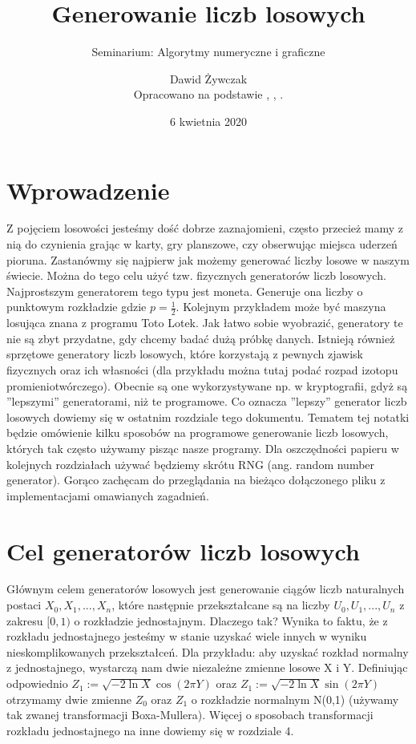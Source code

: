 \documentclass[a4paper]{scrartcl}
\title{Generowanie liczb losowych}
\subtitle{Seminarium: Algorytmy numeryczne i graficzne}
\author{Dawid Żywczak\\
Opracowano na podstawie \cite{Knuth}, \cite{RNGZiel2}, \cite{RNGZiel}.}
\date{6 kwietnia 2020}
\begin{document}
\maketitle

\tableofcontents
\clearpage
\section{Wprowadzenie}
\qquad Z pojęciem losowości jesteśmy dość dobrze zaznajomieni, często przecież mamy z nią do czynienia grając w karty, gry planszowe, czy obserwując miejsca uderzeń pioruna. Zastanówmy się najpierw jak możemy generować liczby losowe w naszym świecie. Można do tego celu użyć tzw. fizycznych generatorów liczb losowych. Najprostszym generatorem tego typu jest moneta. Generuje ona liczby o punktowym rozkładzie gdzie $p=\frac{1}{2}$. Kolejnym przykładem może być maszyna losująca znana z programu Toto Lotek. Jak łatwo sobie wyobrazić, generatory te nie są zbyt przydatne, gdy chcemy badać dużą próbkę danych. Istnieją również sprzętowe generatory liczb losowych, które korzystają z pewnych zjawisk fizycznych oraz ich własności (dla przykładu można tutaj podać rozpad izotopu promieniotwórczego). Obecnie są one wykorzystywane np. w kryptografii, gdyż są ''lepszymi'' generatorami, niż te programowe. Co oznacza ''lepszy'' generator liczb losowych dowiemy się w ostatnim rozdziale tego dokumentu. Tematem tej notatki będzie omówienie kilku sposobów na programowe generowanie liczb losowych, których tak często używamy pisząc nasze programy. Dla oszczędności papieru w kolejnych rozdziałach używać będziemy skrótu RNG (ang. random number generator).
Gorąco zachęcam do przeglądania na bieżąco dołączonego pliku z implementacjami omawianych zagadnień.
\section{Cel generatorów liczb losowych}
Głównym celem generatorów losowych jest generowanie ciągów liczb naturalnych postaci $X_0, X_1,...,X_n$, które następnie przekształcane są na liczby 
$U_0, U_1,...,U_n$ z zakresu $[0,1)$ o rozkładzie jednostajnym. Dlaczego tak? Wynika to faktu, że z rozkładu jednostajnego jesteśmy w stanie uzyskać wiele innych w wyniku nieskomplikowanych przekształceń. Dla przykładu:
aby uzyskać rozkład normalny z jednostajnego, wystarczą nam dwie niezależne zmienne losowe X i Y. Definiując odpowiednio $Z_1:= \sqrt{-2\ln{X}}\cos(2\pi Y)$ oraz $Z_1:= \sqrt{-2\ln{X}}\sin(2\pi Y)$ otrzymamy dwie zmienne $Z_0$ oraz $Z_1$ o rozkładzie normalnym N(0,1) (używamy tak zwanej transformacji Boxa-Mullera). Więcej o sposobach transformacji rozkładu jednostajnego na inne dowiemy się w rozdziale 4.
\end{document}
